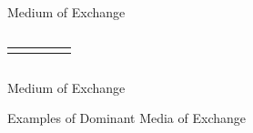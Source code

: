 \documentclass[]{beamer}
\begin{document}
\begin{frame}{Medium of Exchange}
\begin{columns}[T]
\begin{column}{0.5\textwidth}
{\begin{scriptsize}
\begin{center}
\begin{tabular}{l||c|c|c|c}
  &      &         &        & \cellcolor{black!50} \\
						\end{tabular}
					\end{center}
				\end{scriptsize}
			}
		\end{column}
	\end{columns}
\end{frame}

\begin{frame}{Medium of Exchange}
	\begin{figure}
		
	\end{figure}
\end{frame}

\begin{frame}{Examples of Dominant Media of Exchange}
	\begin{figure}
			
	\end{figure}
\end{frame}
\end{document}
